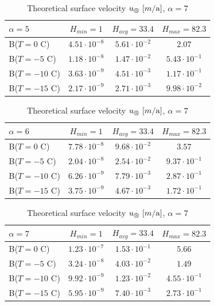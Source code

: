 \begin{table}[htb]
    \centering
    	\caption{Theoretical surface velocity $u_\circledS\,\left[m / \text{a} \right]$, $\alpha = 5$}
	\begin{tabular}{lccc}
	\toprule
	$\alpha=5$ & $H_{min} = 1$ & $H_{avg}=33.4$ & $H_{max} = 82.3$\\
	\midrule
	B($T=0$ C) & $4.51 \cdot 10^{-8}$ & $5.61 \cdot 10^{-2}$ & $2.07$ \\
	B($T=-5$ C) & $1.18 \cdot 10^{-8}$ & $1.47 \cdot 10^{-2}$ & $5.43 \cdot 10^{-1}$ \\
	B($T=-10$ C) & $3.63 \cdot 10^{-9}$ & $4.51 \cdot 10^{-3}$ & $1.17 \cdot 10^{-1}$ \\

	B($T=-15$ C) & $2.17 \cdot 10^{-9}$ & $2.71 \cdot 10^{-3}$ & $9.98 \cdot 10^{-2}$\\
	\bottomrule	
	\end{tabular}
	\label{GPS:tab:theorytable5}
	
	\caption{Theoretical surface velocity $u_\circledS\,\left[m / \text{a} \right]$, $\alpha = 6$}
	\begin{tabular}{lccc}
	\toprule
	$\alpha=6$  & $H_{min} = 1$ & $H_{avg}=33.4$ & $H_{max} = 82.3$ \\
	\midrule
	B($T=0$ C) & $7.78 \cdot 10^{-8}$ & $9.68 \cdot 10^{-2}$ & $3.57$ \\

	B($T=-5$ C) & $2.04 \cdot 10^{-8}$ & $2.54 \cdot 10^{-2}$ & $9.37 \cdot 10^{-1}$ \\
	B($T=-10$ C) & $6.26 \cdot 10^{-9}$ & $7.79 \cdot 10^{-3}$ & $2.87 \cdot 10^{-1}$ \\
	B($T=-15$ C) & $3.75 \cdot 10^{-9}$ & $4.67 \cdot 10^{-3}$ & $1.72 \cdot 10^{-1}$\\
	\bottomrule	
	\end{tabular}
	\label{GPS:tab:theorytable6}
    
    \caption{Theoretical surface velocity $u_\circledS\,\left[m / \text{a} \right]$, $\alpha = 7$}
	\begin{tabular}{lccc}
	\toprule
	$\alpha=7$  & $H_{min} = 1$ & $H_{avg}=33.4$ & $H_{max} = 82.3$ \\
	\midrule
	B($T=0$ C) & $1.23 \cdot 10^{-7}$ & $1.53 \cdot 10^{-1}$ & $5.66$ \\
	B($T=-5$ C) & $3.24 \cdot 10^{-8}$ & $4.03 \cdot 10^{-2}$ & $1.49$ \\
	B($T=-10$ C) & $9.92 \cdot 10^{-9}$ & $1.23 \cdot 10^{-2}$ & $4.55 \cdot 10^{-1}$ \\
	B($T=-15$ C) & $5.95 \cdot 10^{-9}$ & $7.40 \cdot 10^{-3}$ & $2.73 \cdot 10^{-1}$\\
	\bottomrule	
	\end{tabular}
	\label{GPS:tab:theorytable7}
\end{table}

